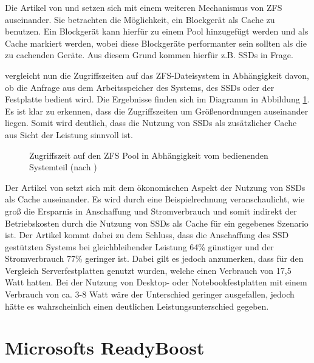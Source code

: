 Die Artikel von \textcite{zfs1} und \textcite{zfs2} setzen sich mit einem weiteren Mechanismus von ZFS auseinander. Sie betrachten die Möglichkeit, ein
Blockgerät als Cache zu benutzen. Ein Blockgerät kann hierfür zu einem Pool hinzugefügt werden und als Cache markiert werden, wobei diese Blockgeräte
performanter sein sollten als die zu cachenden Geräte. Aus diesem Grund kommen hierfür z.B. \acp{SSD} in Frage.

 vergleicht nun die Zugriffszeiten auf das ZFS-Dateisystem in Abhängigkeit davon, ob die Anfrage aus dem Arbeitsspeicher des Systems,
des \ac{SSD}s oder der Festplatte bedient wird. Die Ergebnisse finden sich im Diagramm in Abbildung \ref{zfs2}. Es ist klar zu erkennen, dass die Zugriffszeiten
um Größenordnungen auseinander liegen. Somit wird deutlich, dass die Nutzung von \acp{SSD} als zusätzlicher Cache aus Sicht der Leistung sinnvoll ist.

\begin{figure}[h]\centering
	\caption[Zugriffszeit auf den ZFS Pool in Abhängigkeit vom bedienenden Systemteil]{Zugriffszeit auf den ZFS Pool in Abhängigkeit vom bedienenden Systemteil
	(nach \textcite{zfs2})}
	\label{zfs2}
\end{figure}

Der Artikel von \textcite{zfs1} setzt sich mit dem ökonomischen Aspekt der Nutzung von \acp{SSD} als Cache auseinander. Es wird durch eine Beispielrechnung
veranschaulicht, wie groß die Ersparnis in Anschaffung und Stromverbrauch und somit indirekt der Betriebskosten durch die Nutzung von \acp{SSD} als Cache für ein
gegebenes Szenario ist. Der Artikel kommt dabei zu dem Schluss, dass die Anschaffung des \ac{SSD} gestützten Systems bei gleichbleibender Leistung 64\%
günstiger und der Stromverbrauch 77\% geringer ist. Dabei gilt es jedoch anzumerken, dass für den Vergleich Serverfestplatten genutzt wurden, welche einen
Verbrauch von 17,5 Watt hatten. Bei der Nutzung von Desktop- oder Notebookfestplatten mit einem Verbrauch von ca. 3-8 Watt wäre der Unterschied geringer
ausgefallen, jedoch hätte es wahrscheinlich einen deutlichen Leistungsunterschied gegeben.

\section{Microsofts ReadyBoost}
\label{chap3:readyboost}

